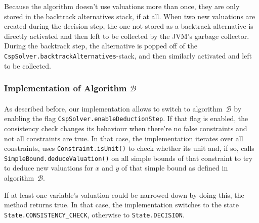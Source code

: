 Because the algorithm doesn't use valuations more than once, they are only stored in the backtrack alternatives stack, if at all.
When two new valuations are created during the decision step, the one not stored as a backtrack alternative is directly activated and then left to be collected by the JVM's garbage collector.
During the backtrack step, the alternative is popped off of the \texttt{CspSolver.backtrackAlternatives}-stack, and then similarly activated and left to be collected.


\subsubsection{Implementation of Algorithm $\mathcal{B}$}

\paragraph{}
As described before, our implementation allows to switch to algorithm~$\mathcal{B}$ by enabling the flag \texttt{CspSolver.enableDeductionStep}.
If that flag is enabled, the consistency check changes its behaviour when there're no false constraints and not all constraints are true.
In that case, the implementation iterates over all constraints, uses \texttt{Constraint.isUnit()} to check whether its unit and, if so, calls \texttt{SimpleBound.deduceValuation()} on all simple bounds of that constraint to try to deduce new valuations for $x$ and $y$ of that simple bound as defined in algorithm~$\mathcal{B}$.

If at least one variable's valuation could be narrowed down by doing this, the method returns true.
In that case, the implementation switches to the state \texttt{State.CONSISTENCY\_CHECK}, otherwise to \texttt{State.DECISION}.
